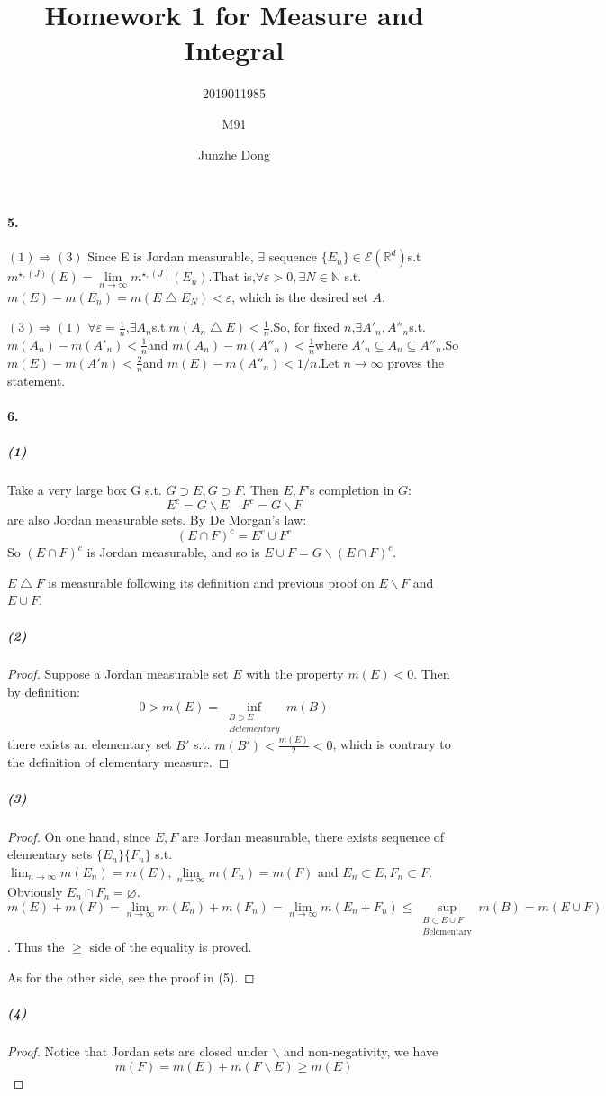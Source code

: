 \documentclass{article}
\author{2019011985\and M91\and Junzhe Dong}
\title{Homework 1 for Measure and Integral}
\begin{document}
\maketitle

\paragraph{5.}
$(1)\Rightarrow (3)$ Since E is Jordan measurable, $\exists$ sequence $\{E_n\}\in \mathcal{E}(\mathbb{R}^d)$s.t$m^{\star ,(J)}(E)=\lim\limits_{n\to\infty}m^{\star,(J)}(E_n)$.That is,$\forall \varepsilon > 0, \exists N\in \mathbb{N}$ s.t.$m(E)-m(E_n)= m(E\bigtriangleup E_N)<\varepsilon$, which is the desired set $A$.

$(3)\Rightarrow (1)$ $\forall \varepsilon=\frac1 n$,$\exists A_n$s.t.$m(A_n\bigtriangleup E)<\frac 1 n$.So, for fixed $n$,$\exists A'_n,A''_n$s.t.$m(A_n)-m(A'_n)<\frac 1 n$and $m(A_n)-m(A''_n)<\frac 1 n$where $A'_n\subseteq A_n \subseteq A''_n$.So $m(E)-m(A'n)<\frac 2 n$and $m(E)-m(A''_n)<1/n$.Let $n\to \infty$ proves the statement.

\paragraph{6.}
\subparagraph{(1)}


Take a very large box G s.t. $G\supset E,G\supset F$. Then $E,F$'s completion in $G$:
\[E^c= G\backslash E\quad F^c=G\backslash F\]
are also Jordan measurable sets. By De Morgan's law:
\[(E\cap F)^c=E^c\cup F^c\]
So $(E\cap F)^c$ is Jordan measurable, and so is $E\cup F=G\backslash(E\cap F)^c$.

$E\bigtriangleup F$ is measurable following its definition and previous proof on $E\backslash F$ and $E\cup F$.
\subparagraph{(2)}
\begin{proof}
Suppose a Jordan measurable set $E$ with the property $m(E)<0$. Then by definition:
\[0>m(E)=\inf_{\substack{B\supset E\\B elementary}}m(B)\]
there exists an elementary set $B'$ s.t. $m(B')<\frac{m(E)}{2}<0$, which is contrary to the definition of elementary measure. 
\end{proof}
\subparagraph{(3)}
\begin{proof}
On one hand, since $E, F$ are Jordan measurable, there exists sequence of elementary sets $\{E_n\}\{F_n\}$ s.t. $\lim_{n\to\infty}m(E_n)=m(E),\lim\limits_{n\to\infty}m(F_n)=m(F)$ and $E_n \subset E, F_n \subset F$. Obviously $E_n\cap F_n=\varnothing$. $m(E)+m(F)=\lim\limits_{n\to\infty}m(E_n)+m(F_n)=\lim\limits_{n\to\infty}m(E_n+F_n)\leq\sup\limits_{\substack{B\subset E\cup F\\B \text{elementary}}}m(B)=m(E\cup F)$. Thus the $\geq$ side of the equality is proved.

As for the other side, see the proof in (5).
\end{proof}
\subparagraph{(4)}
\begin{proof}
Notice that Jordan sets are closed under $\backslash$ and non-negativity, we have 
\[m(F)=m(E)+m(F\backslash E)\geq m(E)\]
\end{proof}
\end{document}
